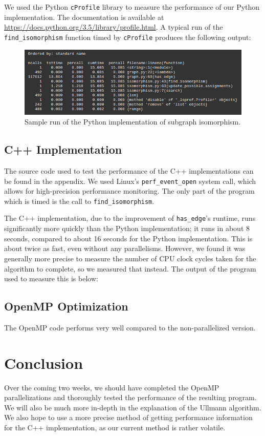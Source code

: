 \documentclass{article}
\begin{document}
  We used the Python \texttt{cProfile} library to measure the performance of our Python implementation. The documentation is available at \url{https://docs.python.org/3.5/library/profile.html}. A typical run of the \texttt{find\_isomorphism} function timed by \texttt{cProfile} produces the following output:

  \begin{figure}[H]
    \centering
    \includegraphics[scale=0.6]{images/perf}
    \caption{Sample run of the Python implementation of subgraph isomorphism.}
  \end{figure}

  \subsection{C++ Implementation}
  The source code used to test the performance of the C++ implementations can be found in the appendix. We used Linux's \texttt{perf\_event\_open} system call, which allows for high-precision performance monitoring. The only part of the program which is timed is the call to \texttt{find\_isomorphism}.

  The C++ implementation, due to the improvement of \texttt{has\_edge}'s runtime, runs significantly more quickly than the Python implementation; it runs in about 8 seconds, compared to about 16 seconds for the Python implementation. This is about twice as fast, even without any parallelisms. However, we found it was generally more precise to measure the number of CPU clock cycles taken for the algorithm to complete, so we measured that instead. The output of the program used to measure this is below:

  \subsection{OpenMP Optimization}
  The OpenMP code performs very well compared to the non-parallelized version.

\section{Conclusion}
  Over the coming two weeks, we should have completed the OpenMP parallelizations and thoroughly tested the performance of the resulting program. We will also be much more in-depth in the explanation of the Ullmann algorithm. We also hope to use a more precise method of getting performance information for the C++ implementation, as our current method is rather volatile.
\end{document}
